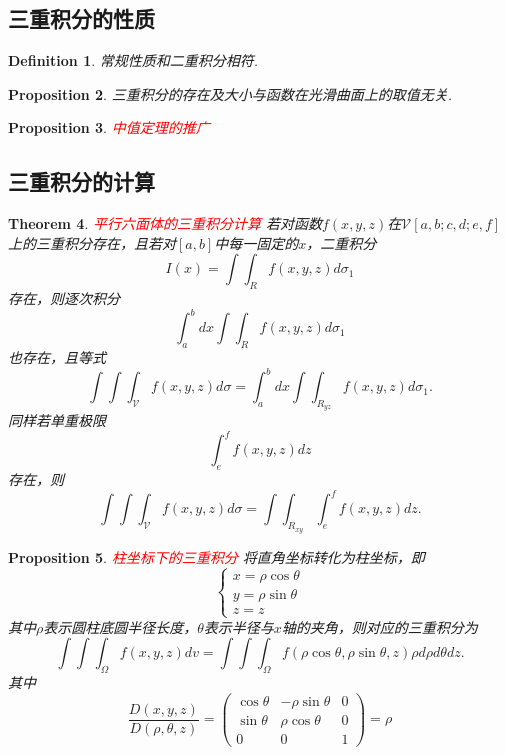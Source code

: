 \documentclass{article}
\newtheorem{theorem}{Theorem}[section]
\newtheorem{proposition}[theorem]{Proposition}
\newtheorem{definition}[theorem]{Definition}
\newcommand{\redt}[1]{\textcolor{red}{#1}}
\begin{document}
\subsection{三重积分的性质}

\begin{definition}
\rm 常规性质和二重积分相符.
\end{definition}

\begin{proposition}
\rm 三重积分的存在及大小与函数在光滑曲面上的取值无关. 
\end{proposition}

\begin{proposition}
\rm \redt{中值定理的推广}
\end{proposition}

\subsection{三重积分的计算}

\begin{theorem}
\rm \redt{平行六面体的三重积分计算} 若对函数$f(x,y,z)$在$\mathcal{V}[a,b;c,d;e,f]$上的三重积分存在，且若对$[a,b]$中每一固定的$x$，二重积分
$$
I(x) = \int\int_{R}f(x,y,z)d\sigma_1
$$
存在，则逐次积分
$$
\int_a^b dx \int\int_{R}f(x,y,z)d\sigma_1
$$
也存在，且等式
$$
\int\int\int_{\mathcal{V}} f(x,y,z)d\sigma = \int_a^b dx \int\int_{R_{yz}}f(x,y,z)d\sigma_1.
$$
同样若单重极限
$$
\int_e^f f(x,y,z)dz
$$
存在，则
$$
\int\int\int_{\mathcal{V}} f(x,y,z)d\sigma = \int\int_{R_{xy}}\int_e^f f(x,y,z)dz.
$$
\end{theorem}

\begin{proposition}
\rm \redt{柱坐标下的三重积分} 将直角坐标转化为柱坐标，即
$$
\left\{
\begin{array}{ll}
x = \rho\cos\theta \\
y = \rho\sin\theta \\
z = z
\end{array}\right.
$$
其中$\rho$表示圆柱底圆半径长度，$\theta$表示半径与$x$轴的夹角，则对应的三重积分为
$$
\int\int\int_{\Omega}f(x,y,z)dv = \int\int\int_{\Omega} f(\rho\cos\theta,\rho\sin\theta,z)\rho d\rho d\theta dz.  
$$
其中
$$
\frac{D(x,y,z)}{D(\rho,\theta,z)} = \begin{pmatrix}
\cos \theta & -\rho\sin \theta & 0 \\
\sin \theta & \rho\cos \theta & 0 \\
0 & 0 & 1
\end{pmatrix} = \rho
$$
\end{proposition}
\end{document}

